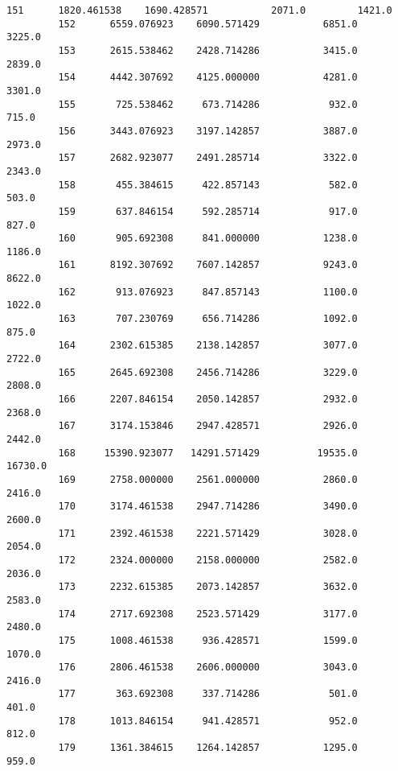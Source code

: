 \documentclass[11pt]{article}
\begin{document}
\begin{Verbatim}[commandchars=\\\{\}]
         151      1820.461538    1690.428571           2071.0         1421.0   
         152      6559.076923    6090.571429           6851.0         3225.0   
         153      2615.538462    2428.714286           3415.0         2839.0   
         154      4442.307692    4125.000000           4281.0         3301.0   
         155       725.538462     673.714286            932.0          715.0   
         156      3443.076923    3197.142857           3887.0         2973.0   
         157      2682.923077    2491.285714           3322.0         2343.0   
         158       455.384615     422.857143            582.0          503.0   
         159       637.846154     592.285714            917.0          827.0   
         160       905.692308     841.000000           1238.0         1186.0   
         161      8192.307692    7607.142857           9243.0         8622.0   
         162       913.076923     847.857143           1100.0         1022.0   
         163       707.230769     656.714286           1092.0          875.0   
         164      2302.615385    2138.142857           3077.0         2722.0   
         165      2645.692308    2456.714286           3229.0         2808.0   
         166      2207.846154    2050.142857           2932.0         2368.0   
         167      3174.153846    2947.428571           2926.0         2442.0   
         168     15390.923077   14291.571429          19535.0        16730.0   
         169      2758.000000    2561.000000           2860.0         2416.0   
         170      3174.461538    2947.714286           3490.0         2600.0   
         171      2392.461538    2221.571429           3028.0         2054.0   
         172      2324.000000    2158.000000           2582.0         2036.0   
         173      2232.615385    2073.142857           3632.0         2583.0   
         174      2717.692308    2523.571429           3177.0         2480.0   
         175      1008.461538     936.428571           1599.0         1070.0   
         176      2806.461538    2606.000000           3043.0         2416.0   
         177       363.692308     337.714286            501.0          401.0   
         178      1013.846154     941.428571            952.0          812.0   
         179      1361.384615    1264.142857           1295.0          959.0   
         

\end{Verbatim}
\end{document}
